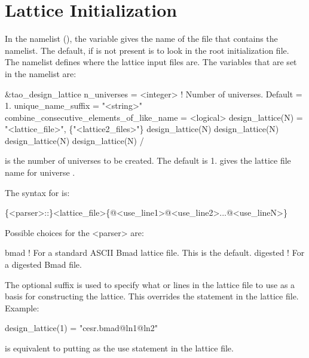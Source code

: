 \section{Lattice Initialization}
\label{s:init.lat} 

In the  namelist (), the  variable gives the name
of the file that contains the  namelist. The default, if  is
not present is to look in the \tao root initialization file. The  namelist
defines where the lattice input files are. The variables that are set in the 
namelist are:
\begin{example}
  &tao_design_lattice
    n_universes        = <integer>      ! Number of universes. Default = 1.
    unique_name_suffix = "<string>"
    combine_consecutive_elements_of_like_name = <logical>
    design_lattice(N) = "<lattice_file>", \{"<lattice2_files>"\}
    design_lattice(N)%
    design_lattice(N)%
    design_lattice(N)%
    design_lattice(N)%
  /
\end{example}
 is the number of universes to be created. The default is 1.  
gives the lattice file name for universe . 

The syntax for  is:
\begin{example}
  \{<parser>::\}<lattice_file>\{@<use_line1>@<use_line2>...@<use_lineN>\}
\end{example}
Possible choices for the <parser> are:
\begin{example}
  bmad      ! For a standard ASCII Bmad lattice file. This is the default.
  digested  ! For a digested Bmad file.
\end{example}
The  optional suffix is used to specify what 
or lines in the lattice file to use as a basis for constructing the lattice. This overrides the
 statement in the lattice file. Example:
\begin{example}
  design_lattice(1) = "cesr.bmad@ln1@ln2"
\end{example}
is equivalent to putting  as the use statement in the  lattice file.

